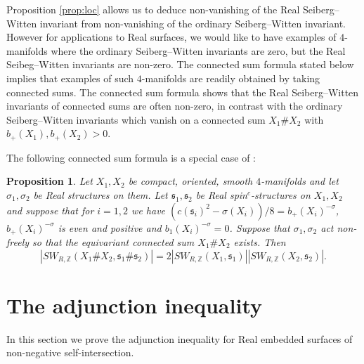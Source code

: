 \documentclass{amsart}
\newtheorem{proposition}[theorem]{Proposition}
\theoremstyle{definition}
\theoremstyle{remark}
\numberwithin{equation}{section}
\begin{document}
Proposition \ref{prop:loc} allows us to deduce non-vanishing of the Real Seiberg--Witten invariant from non-vanishing of the ordinary Seiberg--Witten invariant. However for applications to Real surfaces, we would like to have examples of $4$-manifolds where the ordinary Seiberg--Witten invariants are zero, but the Real Seibeg--Witten invariants are non-zero. The connected sum formula stated below implies that examples of such $4$-manifolds are readily obtained by taking connected sums. The connected sum formula shows that the Real Seiberg--Witten invariants of connected sums are often non-zero, in contrast with the ordinary Seiberg--Witten invariants which vanish on a connected sum $X_1 \# X_2$ with $b_+(X_1), b_+(X_2) > 0$.

The following connected sum formula is a special case of \cite[Theorem 1.12]{bar3}:

\begin{proposition}\label{prop:csf}
Let $X_1,X_2$ be compact, oriented, smooth $4$-manifolds and let $\sigma_1, \sigma_2$ be Real structures on them. Let $\mathfrak{s}_1, \mathfrak{s}_2$ be Real spin$^c$-structures on $X_1,X_2$ and suppose that for $i=1,2$ we have $(c(\mathfrak{s}_i)^2 - \sigma(X_i))/8 = b_+(X_i)^{-\sigma}$, $b_+(X_i)^{-\sigma}$ is even and positive and $b_1(X_i)^{-\sigma} = 0$. Suppose that $\sigma_1,\sigma_2$ act non-freely so that the equivariant connected sum $X_1 \# X_2$ exists. Then
\[
|SW_{R,\mathbb{Z}}(X_1 \# X_2 , \mathfrak{s}_1 \# \mathfrak{s}_2) | = 2 |SW_{R,\mathbb{Z}}(X_1 , \mathfrak{s}_1)| |SW_{R,\mathbb{Z}}(X_2 , \mathfrak{s}_2) |.
\]
\end{proposition}


\section{The adjunction inequality}\label{sec:adj1}

In this section we prove the adjunction inequality for Real embedded surfaces of non-negative self-intersection.
\end{document}
